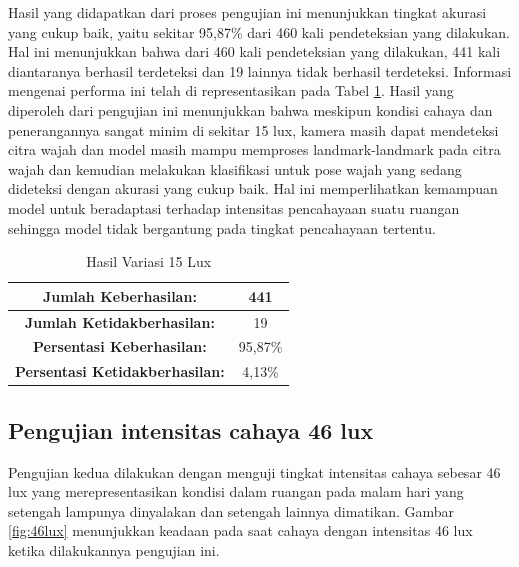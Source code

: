 Hasil yang didapatkan dari proses pengujian ini menunjukkan tingkat akurasi yang cukup baik, yaitu sekitar 95,87\% dari 460 kali pendeteksian yang dilakukan. Hal ini menunjukkan bahwa dari 460 kali pendeteksian yang dilakukan, 441 kali diantaranya berhasil terdeteksi dan 19 lainnya tidak berhasil terdeteksi. Informasi mengenai performa ini telah di representasikan pada Tabel \ref{tb:15lux}. Hasil yang diperoleh dari pengujian ini menunjukkan bahwa meskipun kondisi cahaya dan penerangannya sangat minim di sekitar 15 lux, kamera masih dapat mendeteksi citra wajah dan model masih mampu memproses landmark-landmark pada citra wajah dan kemudian melakukan klasifikasi untuk pose wajah yang sedang dideteksi dengan akurasi yang cukup baik. Hal ini memperlihatkan kemampuan model untuk beradaptasi terhadap intensitas pencahayaan suatu ruangan sehingga model tidak bergantung pada tingkat pencahayaan tertentu.

\begin{longtable}{|c|c|}
  \caption{Hasil Variasi 15 Lux}
  \label{tb:15lux}   \\
  \hline
  \cellcolor[HTML]{C0C0C0}
  \textbf{Jumlah Keberhasilan:} & 441\\
  \hline
  \cellcolor[HTML]{C0C0C0}
  \textbf{Jumlah Ketidakberhasilan:} & 19\\
  \hline
  \cellcolor[HTML]{C0C0C0}
  \textbf{Persentasi Keberhasilan:} & 95,87\% \\
  \hline
  \cellcolor[HTML]{C0C0C0}
  \textbf{Persentasi Ketidakberhasilan:} & 4,13\% \\
  \hline
  \end{longtable}


\subsection{Pengujian intensitas cahaya 46 lux}
Pengujian kedua dilakukan dengan menguji tingkat intensitas cahaya sebesar 46 lux yang merepresentasikan kondisi dalam ruangan pada malam hari yang setengah lampunya dinyalakan dan setengah lainnya dimatikan. Gambar \ref{fig:46lux} menunjukkan keadaan pada saat cahaya dengan intensitas 46 lux ketika dilakukannya pengujian ini.


